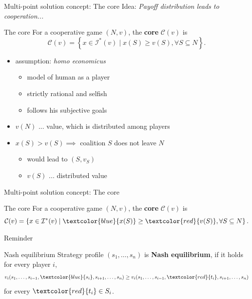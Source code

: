 \documentclass{beamer}
\newcommand{\I}{\mathcal{I}}
\begin{document}
\begin{frame}{Multi-point solution concept: The core}
    Idea: \textit{Payoff distribution leads to cooperation...}
	\pause
    \begin{block}{The core}
		\pause
    	For a cooperative game $(N,v)$, the \textbf{core} $\mathcal{C}(v)$ is
    	\[\mathcal{C}(v) = \left\{x \in \I^*(v) \mid x(S) \geq v(S), \forall S \subseteq N \right\}.\]
    \end{block}
    \begin{itemize}
        \item<4-> assumption: \textit{homo economicus} 
        \begin{itemize}
            \item<5-> model of human as a player
            \item<5-> strictly rational and selfish
            \item<5-> follows his subjective goals
        \end{itemize}
        \item<6-> $v(N)$ ... value, which is distributed among players
        \item<7-> $x(S) > v(S) \implies$ coalition $S$ does not leave $N$ 
        \begin{itemize}
            \item<8-> would lead to $(S,v_S)$
            \item<8-> $v(S)$ ... distributed value
        \end{itemize}
    \end{itemize}
\end{frame}



\begin{frame}{Multi-point solution concept: The core}
    \begin{block}{The core}
    For a cooperative game $(N,v)$, the \textbf{core} $\mathcal{C}(v)$ is
    \[\mathcal{C}(v) = \left\{x \in \I^*(v) \mid \textcolor{blue}{x(S)} \geq \textcolor{red}{v(S)}, \forall S \subseteq N \right\}.\]
    \end{block}
	\pause
    Reminder
    \begin{block}{Nash equilibrium}
		\pause
		Strategy profile $(s_1,\dots,s_n)$ is \textbf{Nash equilibrium}, if it holds for every player $i$,
		\[
			v_i(s_1,\dots,s_{i-1},\textcolor{blue}{s_i},s_{i+1},\dots,s_n) \geq v_i(s_1,\dots,s_{i-1},\textcolor{red}{t_i},s_{i+1},\dots,s_n)
		\]
		for every $\textcolor{red}{t_i} \in S_i$.
	\end{block}
\end{frame}
\end{document}
